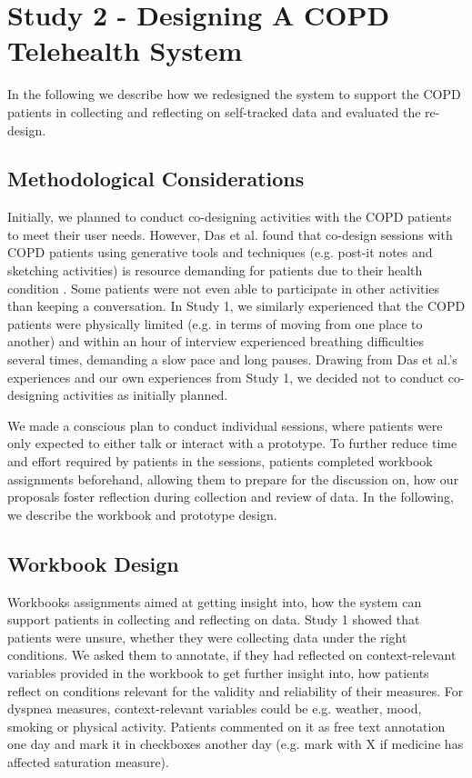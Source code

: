 \section{Study 2 - Designing A COPD Telehealth System}     
In the following we describe how we redesigned the system to support the COPD patients in collecting and reflecting on self-tracked data and evaluated the re-design. 

\subsection{Methodological Considerations}
Initially, we planned to conduct co-designing activities with the COPD patients to meet their user needs. However, Das et al. found that co-design sessions with COPD patients using generative tools and techniques (e.g. post-it notes and sketching activities) is resource demanding for patients due to their health condition \cite{Das}. Some patients were not even able to participate in other activities than keeping a conversation. In Study 1, we similarly experienced that the COPD patients were physically limited (e.g. in terms of moving from one place to another) and within an hour of interview experienced breathing difficulties several times, demanding a slow pace and long pauses. Drawing from Das et al.’s experiences and our own experiences from Study 1, we decided not to conduct co-designing activities as initially planned. 

We made a conscious plan to conduct individual sessions, where patients were only expected to either talk or interact with a prototype. To further reduce time and effort required by patients in the sessions, patients completed workbook assignments beforehand, allowing them to prepare for the discussion on, how our proposals foster reflection during collection and review of data. In the following, we describe the workbook and prototype design.

\subsection{Workbook Design}
Workbooks assignments aimed at getting insight into, how the system can support patients in collecting and reflecting on data. Study 1 showed that patients were unsure, whether they were collecting data under the right conditions. We asked them to annotate, if they had reflected on context-relevant variables provided in the workbook to get further insight into, how patients reflect on conditions relevant for the validity and reliability of their measures. For dyspnea measures, context-relevant variables could be e.g. weather, mood, smoking or physical activity. Patients commented on it as free text annotation one day and mark it in checkboxes another day (e.g. mark with X if medicine has affected saturation measure).

